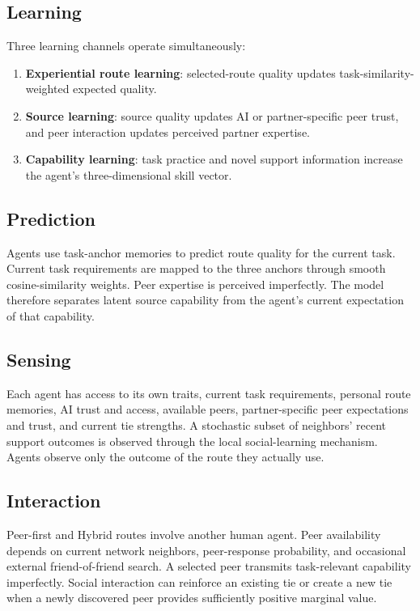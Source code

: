 \documentclass[11pt]{article}
\begin{document}
\subsection{Learning}
Three learning channels operate simultaneously:
\begin{enumerate}
\item \textbf{Experiential route learning}: selected-route quality updates task-similarity-weighted expected quality.
\item \textbf{Source learning}: source quality updates AI or partner-specific peer trust, and peer interaction updates perceived partner expertise.
\item \textbf{Capability learning}: task practice and novel support information increase the agent's three-dimensional skill vector.
\end{enumerate}

\subsection{Prediction}
Agents use task-anchor memories to predict route quality for the current task. Current task requirements are mapped to the three anchors through smooth cosine-similarity weights. Peer expertise is perceived imperfectly. The model therefore separates latent source capability from the agent's current expectation of that capability.

\subsection{Sensing}
Each agent has access to its own traits, current task requirements, personal route memories, AI trust and access, available peers, partner-specific peer expectations and trust, and current tie strengths. A stochastic subset of neighbors' recent support outcomes is observed through the local social-learning mechanism. Agents observe only the outcome of the route they actually use.

\subsection{Interaction}
Peer-first and Hybrid routes involve another human agent. Peer availability depends on current network neighbors, peer-response probability, and occasional external friend-of-friend search. A selected peer transmits task-relevant capability imperfectly. Social interaction can reinforce an existing tie or create a new tie when a newly discovered peer provides sufficiently positive marginal value.
\end{document}

